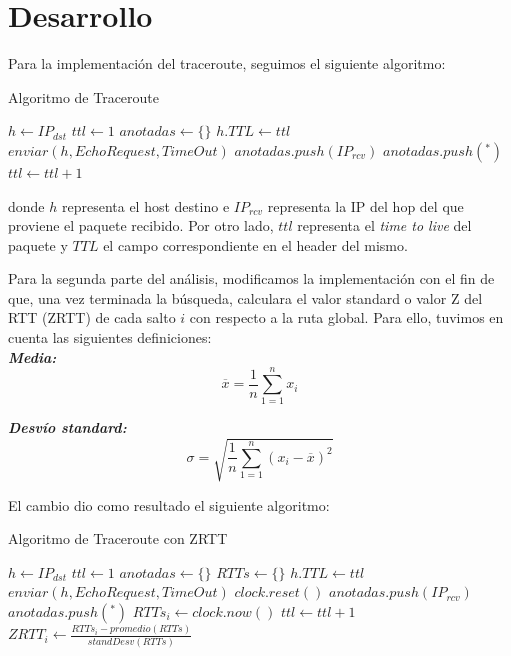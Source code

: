 \documentclass[10pt, a4paper]{article}
\begin{document}
\section{Desarrollo}
Para la implementación del traceroute, seguimos el siguiente algoritmo:

\begin{algorithm}
\caption{Algoritmo de Traceroute}
\begin{algorithmic}

\State $h\gets IP_{dst}$
\State $ttl\gets 1$
\State $anotadas \gets \{\}$
\Repeat
	\State $h.TTL \gets ttl$
	\State $enviar(h, EchoRequest, TimeOut)$
    	\State $anotadas.push(IP_{rcv})$
    \Else
    	\State $anotadas.push(^*)$
    \EndIf
    \State $ttl\gets ttl+1$
\EndProcedure
\end{algorithmic}
\end{algorithm}

donde $h$ representa el host destino e $IP_{rcv}$ representa la IP del hop del que proviene el paquete recibido. Por otro lado, $ttl$ representa el \textit{time to live} del paquete y $TTL$ el campo correspondiente en el header del mismo.

Para la segunda parte del análisis, modificamos la implementación con el fin de que, una vez terminada la búsqueda, calculara el valor standard o valor Z del RTT (ZRTT) de cada salto $i$ con respecto a la ruta global. Para ello, tuvimos en cuenta las siguientes definiciones:\\

\textit{\textbf{Media:}}
$$\overline{x} = \frac{1}{n} \sum_{1=1}^{n}x_i$$


\textit{\textbf{Desvío standard:}}
$$\sigma = \sqrt{\frac{1}{n} \sum_{1=1}^{n}(x_i - \overline{x})^2}$$

El cambio dio como resultado el siguiente algoritmo:

\begin{algorithm}[H]
\caption{Algoritmo de Traceroute con ZRTT}
\begin{algorithmic}

\State $h\gets IP_{dst}$
\State $ttl\gets 1$
\State $anotadas \gets \{\}$
\State $RTTs \gets \{\}$
\Repeat
	\State $h.TTL \gets ttl$
	\State $enviar(h, EchoRequest, TimeOut)$
	\State $clock.reset()$
    	\State $anotadas.push(IP_{rcv})$
    \Else
    	\State $anotadas.push(^*)$
    \EndIf
    \State $RTTs_i \gets clock.now()$
    \State $ttl\gets ttl+1$
    \State $ZRTT_i \gets \frac{RTTs_i - promedio(RTTs)}{standDesv(RTTs)}$
\EndProcedure
\end{algorithmic}
\end{algorithm}
\end{document}
